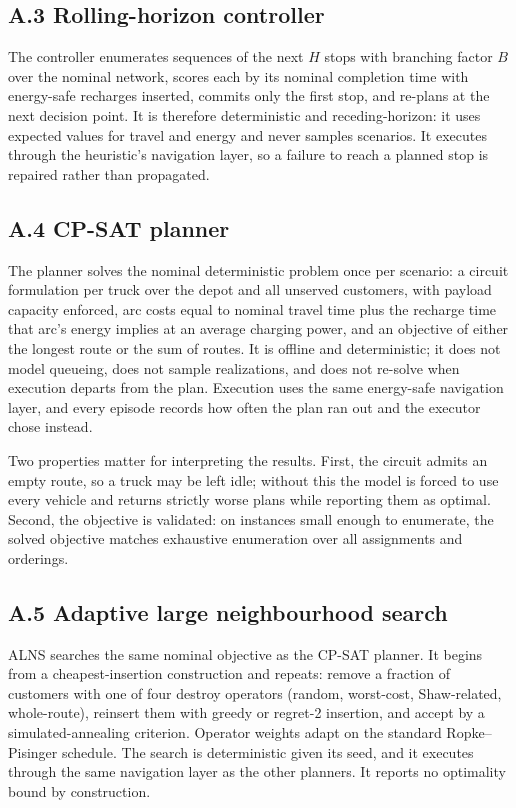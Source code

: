 \documentclass[a4paper,fleqn]{cas-sc}
\begin{document}
\subsection*{A.3 Rolling-horizon controller}

The controller enumerates sequences of the next $H$ stops with branching factor
$B$ over the nominal network, scores each by its nominal completion time with
energy-safe recharges inserted, commits only the first stop, and re-plans at the
next decision point. It is therefore deterministic and receding-horizon: it uses
expected values for travel and energy and never samples scenarios. It executes
through the heuristic's navigation layer, so a failure to reach a planned stop
is repaired rather than propagated.

\subsection*{A.4 CP-SAT planner}

The planner solves the nominal deterministic problem once per scenario: a
circuit formulation per truck over the depot and all unserved customers, with
payload capacity enforced, arc costs equal to nominal travel time plus the
recharge time that arc's energy implies at an average charging power, and an
objective of either the longest route or the sum of routes. It is offline and
deterministic; it does not model queueing, does not sample realizations, and
does not re-solve when execution departs from the plan. Execution uses the same
energy-safe navigation layer, and every episode records how often the plan ran
out and the executor chose instead.

Two properties matter for interpreting the results. First, the circuit admits an
empty route, so a truck may be left idle; without this the model is forced to
use every vehicle and returns strictly worse plans while reporting them as
optimal. Second, the objective is validated: on instances small enough to
enumerate, the solved objective matches exhaustive enumeration over all
assignments and orderings.

\subsection*{A.5 Adaptive large neighbourhood search}

ALNS searches the same nominal objective as the CP-SAT planner. It begins from a
cheapest-insertion construction and repeats: remove a fraction of customers with
one of four destroy operators (random, worst-cost, Shaw-related, whole-route),
reinsert them with greedy or regret-2 insertion, and accept by a
simulated-annealing criterion. Operator weights adapt on the standard
Ropke--Pisinger schedule. The search is deterministic given its seed, and it
executes through the same navigation layer as the other planners. It reports no
optimality bound by construction.
\end{document}
